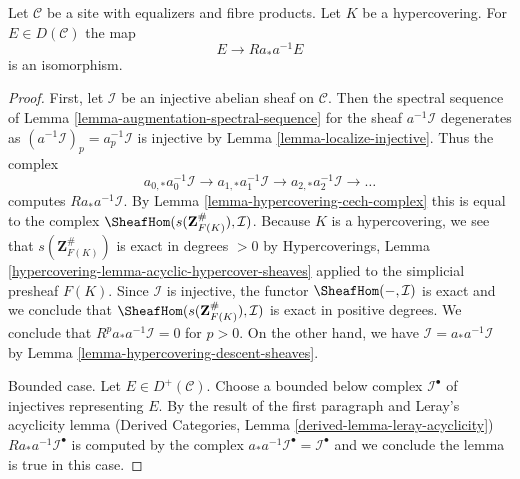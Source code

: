 %
\begin{lemma}
\label{lemma-hypercovering-descent-bounded-abelian}
Let $\mathcal{C}$ be a site with equalizers and fibre products.
Let $K$ be a hypercovering. For
$E \in D(\mathcal{C})$ the map
$$
E \longrightarrow Ra_*a^{-1}E
$$
is an isomorphism.
\end{lemma}

\begin{proof}
First, let $\mathcal{I}$ be an injective abelian sheaf on $\mathcal{C}$.
Then the spectral sequence of
Lemma \ref{lemma-augmentation-spectral-sequence}
for the sheaf $a^{-1}\mathcal{I}$ degenerates as
$(a^{-1}\mathcal{I})_p = a_p^{-1}\mathcal{I}$
is injective by Lemma \ref{lemma-localize-injective}.
Thus the complex
$$
a_{0, *}a_0^{-1}\mathcal{I} \to
a_{1, *}a_1^{-1}\mathcal{I} \to
a_{2, *}a_2^{-1}\mathcal{I} \to\ldots
$$
computes $Ra_*a^{-1}\mathcal{I}$. By
Lemma \ref{lemma-hypercovering-cech-complex}
this is equal to the complex
$\SheafHom(s(\mathbf{Z}_{F(K)}^\#), \mathcal{I})$.
Because $K$ is a hypercovering, we see that
$s(\mathbf{Z}_{F(K)}^\#)$ is exact in degrees $> 0$ by
Hypercoverings, Lemma \ref{hypercovering-lemma-acyclic-hypercover-sheaves}
applied to the simplicial presheaf $F(K)$.
Since $\mathcal{I}$ is injective, the functor $\SheafHom(-, \mathcal{I})$
is exact and we conclude that
$\SheafHom(s(\mathbf{Z}_{F(K)}^\#), \mathcal{I})$
is exact in positive degrees. We conclude that
$R^pa_*a^{-1}\mathcal{I} = 0$ for $p > 0$.
On the other hand, we have $\mathcal{I} = a_*a^{-1}\mathcal{I}$
by Lemma \ref{lemma-hypercovering-descent-sheaves}.

\medskip\noindent
Bounded case. Let $E \in D^+(\mathcal{C})$.
Choose a bounded below complex $\mathcal{I}^\bullet$ of injectives
representing $E$. By the result of the first paragraph and
Leray's acyclicity lemma
(Derived Categories, Lemma \ref{derived-lemma-leray-acyclicity})
$Ra_*a^{-1}\mathcal{I}^\bullet$
is computed by the complex
$a_*a^{-1}\mathcal{I}^\bullet = \mathcal{I}^\bullet$
and we conclude the lemma is true in this case.


\end{proof}
